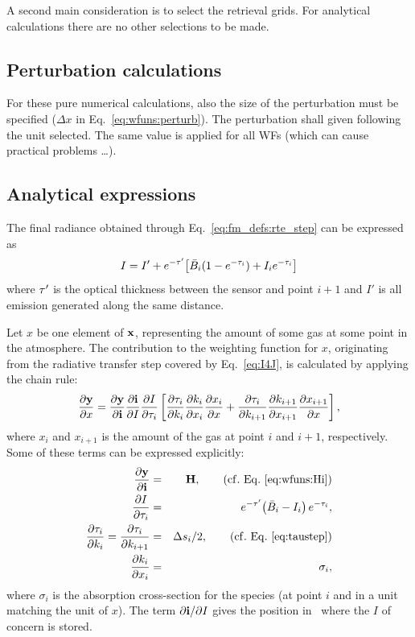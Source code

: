 A second main consideration is to select the retrieval grids. For analytical
calculations there are no other selections to be made. 



\subsection{Perturbation calculations}
%
For these pure numerical calculations, also the size of the perturbation must
be specified ($\Delta x$ in Eq.~\ref{eq:wfuns:perturb}). The perturbation shall
given following the unit selected. The same value is applied for all WFs (which
can cause practical problems \dots).



\subsection{Analytical expressions}
%
The final radiance obtained through Eq.~\ref{eq:fm_defs:rte_step} can be
expressed as
\begin{equation}
  \label{eq:I4J}
  I = I'+ e^{-\tau'}\!\left[ \bar{B}_i(1-e^{-\tau_{i}})+I_ie^{-\tau_{i}}\right]
\end{equation}
where $\tau'$ is the optical thickness between the sensor and point $i+1$
and $I'$ is all emission generated along the same distance.

Let $x$ be one element of $\mathbf{x}$, representing the amount of
some gas at some point in the atmosphere. The contribution to the weighting
function for $x$, originating from the radiative transfer step covered by
Eq.~\ref{eq:I4J}, is calculated by applying the chain rule:
\begin{equation}
  \label{eq:chainrule}
  \frac{\partial \mathbf{y}}{\partial x} =  
  \frac{\partial \mathbf{y}}{\partial \mathbf{i}}
  \frac{\partial \mathbf{i}}{\partial I} \frac{\partial I}{\partial \tau_{i}}
  \left[\frac{\partial \tau_{i}}{\partial k_i}\frac{\partial k_i}{\partial x_i} 
        \frac{\partial x_i}{\partial x} +
        \frac{\partial \tau_{i}}{\partial k_{i+1}}\frac{\partial k_{i+1}}{\partial x_{i+1}}
        \frac{\partial x_{i+1}}{\partial x} \right],
\end{equation}
where $x_i$ and $x_{i+1}$ is the amount of the gas at point $i$ and $i+1$,
respectively. Some of these terms can be expressed explicitly:
\begin{eqnarray}
  \frac{\PartD \MsrVct}{\PartD \MpiVct} &=& \SnsMtr,
               \qquad \mathrm{(cf.\ Eq.\ \ref{eq:wfuns:Hi})} \\
  \frac{\PartD I}{\PartD \aOth{i}} 
      &=& e^{-\Oth'}\!\left( \bar{B}_i-I_i\right)e^{-\aOth{i}}, \\
  \frac{\PartD \aOth{i}}{\PartD k_i}=\frac{\PartD \aOth{i}}{\PartD k_{i+1}} 
      &=& \Delta s_i/2, \qquad \mathrm{(cf.\ Eq.\ \ref{eq:taustep})} \\
  \frac{\PartD k_i}{\PartD x_i}
      &=& \sigma_i, 
\end{eqnarray}
where $\sigma_i$ is the absorption cross-section for the species (at point $i$
and in a unit matching the unit of $x$). The term $\partial \mathbf{i}/\partial I$
gives the position in \MpiVct\ where the $I$ of concern is stored.

